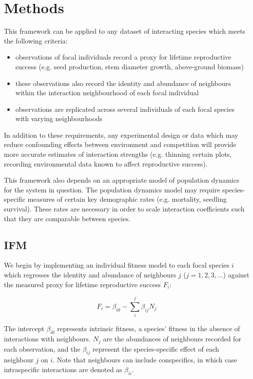 \documentclass[a4,12pt]{article}
\begin{document}
    
\section{Methods}
    
    This framework can be applied to any dataset of interacting species which meets the following criteria: 
    \begin{itemize}
        \item observations of focal individuals record a proxy for lifetime reproductive success (e.g. seed production, stem diameter growth, above-ground biomass)
        \item these observations also record the identity and abundance of neighbours within the interaction neighbourhood of each focal individual
        \item observations are replicated across several individuals of each focal species with varying neighbourhoods
    \end{itemize}
    In addition to these requirements, any experimental design or data which may reduce confounding effects between environment and competition will provide more accurate estimates of interaction strengths (e.g. thinning certain plots, recording environmental data known to affect reproductive success). 
    
    
    This framework also depends on an appropriate model of population dynamics for the system in question. The population dynamics model may require species-specific measures of certain key demographic rates (e.g. mortality, seedling survival). These rates are necessary in order to scale interaction coefficients such that they are comparable between species. 
    
    
    \subsection{IFM}
        
        We begin by implementing an individual fitness model to each focal species $i$ which regresses the identity and abundance of neighbours $j$ ($j = 1, 2, 3, ...$) against the measured proxy for lifetime reproductive success $F_{i}$:
        
        \begin{equation}
        F_{i} = \beta_{i0} - \sum_{i}^{j} \beta_{ij} N_{j}
        \label{ifm}
        \end{equation}
        
        The intercept $\beta_{i0}$ represents intrinsic fitness, a species' fitness in the absence of interactions with neighbours. $N_{j}$ are the abundances of neighbours recorded for each observation, and the $\beta_{ij}$ represent the species-specific effect of each neighbour $j$ on $i$. Note that neighbours can include conspecifics, in which case intraspecific interactions are denoted as $\beta_{ii}$.
              
\end{document}
